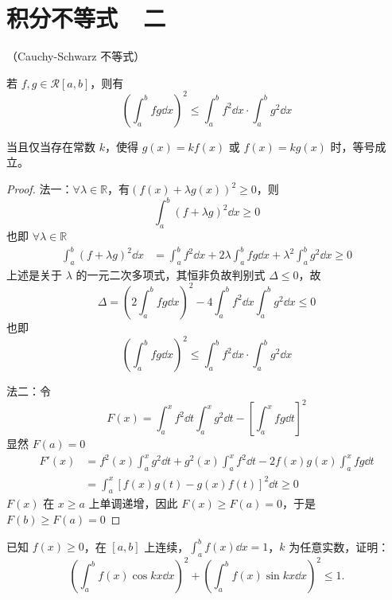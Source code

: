 \section{积分不等式~~二 }
\begin{proposition}
（Cauchy-Schwarz 不等式）

若 $f,g \in \mathcal{R}[a,b]$，则有
\[\left( \int_{a}^{b} f g \dd x \right)^2
\leq 
\int_{a}^{b} f^2 \dd x \cdot \int_{a}^{b} g^2 \dd x\]

当且仅当存在常数 $k$，使得 $g(x)=k f(x)$ 或 $f(x)=k g(x)$ 时，等号成立。
\end{proposition}
\begin{proof}
	法一：$\forall \lambda \in \mathbb{R}$，有$(f(x)+\lambda g(x))^2 \geqslant 0$，则
	\[
	\int_{a}^{b} (f+\lambda g)^2 \dd x \geqslant 0
	\]
	也即 $\forall \lambda \in \mathbb{R}$
	\begin{align*}
		\int_{a}^{b} (f+\lambda g)^2 \dd x
		&= \int_{a}^{b} f^2 \dd x + 2\lambda \int_{a}^{b} fg \dd x + \lambda^2 \int_{a}^{b} g^2 \dd x \geqslant 0
	\end{align*}
	上述是关于 $\lambda$ 的一元二次多项式，其恒非负故判别式 $\Delta \leqslant 0$，故
	\[
	\Delta = \left( 2\int_{a}^{b} fg \dd x \right)^2 - 4 \int_{a}^{b} f^2 \dd x \int_{a}^{b} g^2 \dd x \leqslant 0
	\]
	也即
	\[
	\left( \int_{a}^{b} fg \dd x \right)^2 \leqslant \int_{a}^{b} f^2 \dd x \cdot \int_{a}^{b} g^2 \dd x
	\]
	
	法二：令
	\[
	F(x) = \int_{a}^{x} f^2 \dd t \int_{a}^{x} g^2 \dd t - \left[ \int_{a}^{x} fg \dd t \right]^2
	\]
	显然 $F(a) = 0$
	\begin{align*}
		F'(x) &= f^2(x) \int_{a}^{x} g^2 \dd t + g^2(x) \int_{a}^{x} f^2 \dd t - 2f(x)g(x) \int_{a}^{x} fg \dd t \\
		&= \int_{a}^{x} \left[ f(x)g(t) - g(x)f(t) \right]^2 \dd t \geqslant 0
	\end{align*}
	$F(x)$ 在 $x \geqslant a$ 上单调递增，因此 $F(x) \geqslant F(a) = 0$，于是 $F(b) \geqslant F(a) = 0$
\end{proof}

\begin{problem}
	已知 $f(x)\geqslant 0$，在 $[a,b]$ 上连续，$\displaystyle\int_a^b f(x)\dd x=1$，$k$ 为任意实数，证明：
	\[
	\left(\int_a^b f(x)\cos kx\dd x\right)^2+
	\left(\int_a^b f(x)\sin kx\dd x\right)^2\leqslant 1.
	\]
\end{problem}

